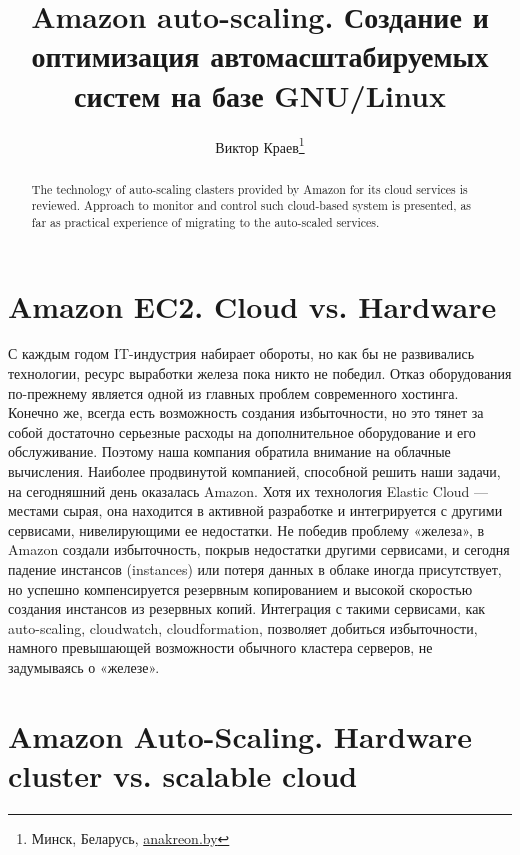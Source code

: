 \documentclass[10pt, a5paper]{article}
\begin{document}
\title{Amazon auto-scaling. Создание и оптимизация автомасштабируемых систем на базе GNU/Linux}
\author{Виктор Краев\footnote{Минск, Беларусь, \url{anakreon.by}}}
\date{}
\maketitle
\begin{abstract}\noindent 
The technology of auto-scaling clasters provided by Amazon for its cloud services is reviewed. Approach to monitor and control such cloud-based system is presented, as far as practical experience of migrating to the auto-scaled services.
\end{abstract}

\section*{Amazon EC2. Cloud vs. Hardware}
С каждым годом IT-индустрия набирает обороты, но как бы не развивались технологии, ресурс выработки железа пока никто не победил. Отказ оборудования по-прежнему является одной из главных проблем современного хостинга. Конечно же, всегда есть возможность создания избыточности, но это тянет за собой достаточно серьезные расходы на дополнительное оборудование и его обслуживание. Поэтому наша компания обратила внимание на облачные вычисления. Наиболее продвинутой компанией, способной решить наши задачи, на сегодняшний день оказалась Amazon. Хотя их технология Elastic Cloud --- местами сырая, она находится в активной разработке и интегрируется с другими сервисами, нивелирующими ее недостатки. Не победив проблему «железа», в Amazon создали избыточность, покрыв недостатки другими сервисами, и сегодня падение инстансов (instances) или потеря данных в облаке иногда присутствует, но успешно компенсируется резервным копированием и высокой скоростью создания инстансов из резервных копий. Интеграция с такими сервисами, как auto-scaling, cloudwatch, cloudformation, позволяет добиться избыточности, намного превышающей возможности обычного кластера серверов, не задумываясь о «железе».  

\section*{Amazon Auto-Scaling. Hardware cluster vs. scalable cloud}
\end{document}
